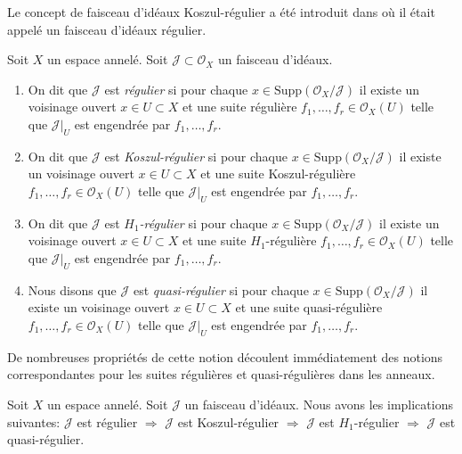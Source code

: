 \begin{definition}
\label{definition-regular-ideal-sheaf}
\begin{reference}
Le concept de faisceau d'idéaux Koszul-régulier a été introduit dans  \cite[Expose VII, Definition 1.4]{SGA6} 
où il était appelé un faisceau d'idéaux régulier.
\end{reference}
Soit  $X$  un espace annelé. Soit  $\mathcal{J} \subset \mathcal{O}_X$  un faisceau d'idéaux.
\begin{enumerate}
\item On dit que  $\mathcal{J}$  est  {\it  régulier}  si pour
chaque  $x \in \text{Supp}(\mathcal{O}_X/\mathcal{J})$  il existe un voisinage ouvert  $x \in U \subset X$  et une suite
régulière  $f_1, \ldots, f_r \in \mathcal{O}_X(U)$  telle que  $\mathcal{J}|_U$  est engendrée par  $f_1, \ldots, f_r$.
\item On dit que  $\mathcal{J}$  est  {\it  Koszul-régulier} 
si pour chaque  $x \in \text{Supp}(\mathcal{O}_X/\mathcal{J})$  il existe un voisinage ouvert  $x \in U \subset X$  et une
suite Koszul-régulière  $f_1, \ldots, f_r \in \mathcal{O}_X(U)$  telle que  $\mathcal{J}|_U$  est engendrée par
 $f_1, \ldots, f_r$.
\item On dit que  $\mathcal{J}$  est  {\it 
 $H_1$-régulier}  si pour chaque  $x \in \text{Supp}(\mathcal{O}_X/\mathcal{J})$  il existe un
voisinage ouvert  $x \in U \subset X$  et une suite  $H_1$-régulière  $f_1, \ldots, f_r \in \mathcal{O}_X(U)$ 
telle que  $\mathcal{J}|_U$  est engendrée par  $f_1, \ldots, f_r$.
\item Nous disons que  $\mathcal{J}$  est  {\it 
quasi-régulier}  si pour chaque  $x \in \text{Supp}(\mathcal{O}_X/\mathcal{J})$  il existe un voisinage
ouvert  $x \in U \subset X$  et une suite quasi-régulière  $f_1, \ldots, f_r \in \mathcal{O}_X(U)$  telle que
 $\mathcal{J}|_U$  est engendrée par  $f_1, \ldots, f_r$.
\end{enumerate}
\end{definition}

\noindent
De nombreuses propriétés de cette notion découlent immédiatement des notions
correspondantes pour les suites régulières et quasi-régulières dans les anneaux.

\begin{lemma}
\label{lemma-regular-quasi-regular-scheme}
Soit  $X$  un espace annelé. Soit  $\mathcal{J}$  un faisceau d'idéaux. Nous
avons les implications suivantes:  $\mathcal{J}$  est régulier  $\Rightarrow$ 
 $\mathcal{J}$  est Koszul-régulier  $\Rightarrow$   $\mathcal{J}$  est
 $H_1$-régulier  $\Rightarrow$   $\mathcal{J}$  est quasi-régulier.
\end{lemma}

